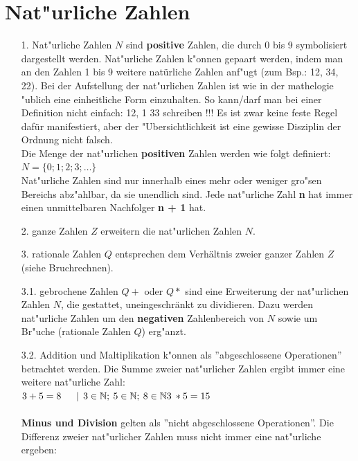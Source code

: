\documentclass[10pt]{book}
\begin{document}
\section{Nat"urliche Zahlen}
\begin{itemize}
  \item[1.] Nat"urliche Zahlen $N$ sind \textbf{positive} Zahlen, die durch 0
            bis 9 symbolisiert dargestellt werden.
            Nat"urliche Zahlen k"onnen gepaart werden, indem man an den Zahlen 1 bis 9
            weitere natürliche Zahlen anf"ugt (zum Bsp.: 12, 34, 22).
            Bei der Aufstellung der nat"urlichen Zahlen ist wie in der mathelogie
            "ublich eine einheitliche Form einzuhalten.
            So kann/darf man bei einer Definition nicht einfach: 12, 1 33
            schreiben !!!
            Es ist zwar keine feste Regel dafür manifestiert, aber der "Ubersichtlichkeit
            ist eine gewisse Disziplin der Ordnung nicht falsch. \\

            Die Menge der nat"urlichen \textbf{positiven} Zahlen werden wie folgt
            definiert: \\
            $N = \{ 0;1;2;3; \ldots \}$ \\

            Nat"urliche Zahlen sind nur innerhalb eines mehr oder weniger
            gro"sen Bereichs abz"ahlbar, da sie unendlich sind. Jede nat"urliche Zahl
            \textbf{n} hat immer einen unmittelbaren Nachfolger \textbf{n + 1} hat.
  \item[2.] ganze Zahlen $Z$ erweitern die nat"urlichen Zahlen $N$.
  \item[3.] rationale Zahlen $Q$ entsprechen dem Verhältnis zweier ganzer Zahlen $Z$
            (siehe Bruchrechnen).
  \item[3.1.] gebrochene Zahlen $Q+$ oder $Q*$ sind eine Erweiterung der nat"urlichen
              Zahlen $N$, die gestattet, uneingeschränkt zu dividieren.
              Dazu werden nat"urliche Zahlen um den \textbf{negativen} Zahlenbereich von
              $N$ sowie um Br"uche (rationale Zahlen $Q$) erg"anzt.

  \item[3.2.] Addition und Maltiplikation k"onnen als ''abgeschlossene Operationen'' betrachtet werden.
              Die Summe zweier nat"urlicher Zahlen ergibt immer eine weitere nat"urliche Zahl:
              \\
              $3 + 5 = 8 \:\:\:\:\:\:\: | \:\: 3 \in \mathbb{N}; \: 5 \in \mathbb{N}; \: 8 \in \mathbb{N} \\
              3 \: * 5 = 15 $
              \\
              \\
              \textbf{Minus und Division} gelten als ''nicht abgeschlossene Operationen''.
              Die Differenz zweier nat"urlicher Zahlen muss nicht immer eine
              nat"urliche ergeben:


\end{itemize}
\end{document}

